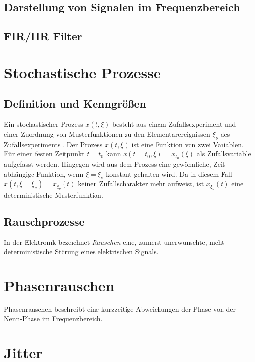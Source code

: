 \subsection{Darstellung von Signalen im Frequenzbereich}
\subsection{FIR/IIR Filter}

\section{Stochastische Prozesse}

\subsection{Definition und Kenngrößen}
Ein stochastischer Prozess $x(t,\xi)$ besteht aus einem Zufallsexperiment und einer Zuordnung von Musterfunktionen zu den Elementarereignissen $\xi_\nu$ des Zufallsexperiments \cite[S.~243]{Leon2015}. Der Prozess $x(t,\xi)$ ist eine Funktion von zwei Variablen. Für einen festen Zeitpunkt $t=t_0$ kann $x(t=t_0,\xi)=x_{t_0}(\xi)$ als Zufallsvariable aufgefasst werden. Hingegen wird aus dem Prozess eine gewöhnliche, Zeit-abhängige Funktion, wenn $\xi=\xi_\nu$ konstant gehalten wird. Da in diesem Fall $x(t,\xi=\xi_\nu)=x_{\xi_\nu}(t)$ keinen Zufallscharakter mehr aufweist, ist $x_{\xi_\nu}(t)$ eine deterministische Musterfunktion.



\subsection{Rauschprozesse}
In der Elektronik bezeichnet \textit{Rauschen} eine, zumeist unerwünschte, nicht-\-deterministische Störung eines elektrischen Signals.

\section{Phasenrauschen}

\begin{definition}[Phasenrauschen]
	Phasenrauschen beschreibt eine kurzzeitige Abweichungen der Phase von der Nenn-Phase im Frequenzbereich. \cite{IEEErandom}
\end{definition}


\section{Jitter}

